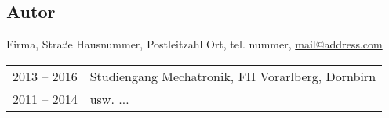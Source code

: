 \documentclass[./\jobname.tex]{subfiles}
\begin{document}
\begin{envMode}[\paper]
%
	\section*{Autor}
	\vskip 9pt
	\noindent
	\begin{minipage}{0.1\columnwidth}%
	\end{minipage}\hspace{5mm}\hfill
	\begin{minipage}{0.9\columnwidth}%
		\authorName \authorSurname%
		\vskip 9pt%
		Firma, %
		Straße Hausnummer, %
		Postleitzahl Ort, %
		tel. nummer, %
		\href{mailto:mail@address.com}{mail@address.com}%
		\vskip 9pt%
		\begin{tabular}{@{}ll}
			2013 – 2016	& Studiengang Mechatronik, FH Vorarlberg, Dornbirn\\ 
			2011 – 2014	& usw. \(\ldots\)
		\end{tabular}
	\end{minipage}
%
\end{envMode}
\end{document}
